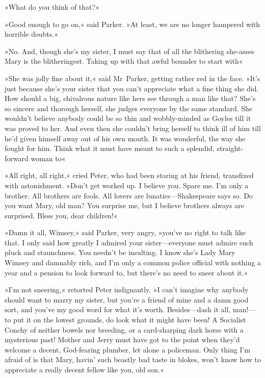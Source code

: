 »What do you think of that?«

»Good enough to go on,« said Parker. »At least, we are no longer hampered with horrible doubts.«

»No. And, though she's my sister, I must say that of all the blithering she-asses Mary is the blitheringest. Taking up with that awful bounder to start with\longdash«

»She was jolly fine about it,« said Mr~Parker, getting rather red in the face. »It's just because she's your sister that you can't appreciate what a fine thing she did. How should a big, chivalrous nature like hers see through a man like that? She's so sincere and thorough herself, she judges everyone by the same standard. She wouldn't believe anybody could be so thin and wobbly-minded as Goyles till it was proved to her. And even then she couldn't bring herself to think ill of him till he'd given himself away out of his own mouth. It was wonderful, the way she fought for him. Think what it must have meant to such a splendid, straight-forward woman to\longdash«

»All right, all right,« cried Peter, who had been staring at his friend, transfixed with astonishment. »Don't get worked up. I believe you. Spare me. I'm only a brother. All brothers are fools. All lovers are lunatics—Shakespeare says so. Do you want Mary, old man? You surprise me, but I believe brothers always are surprised. Bless you, dear children!«

»Damn it all, Wimsey,« said Parker, very angry, »you've no right to talk like that. I only said how greatly I admired your sister—everyone must admire such pluck and staunchness. You needn't be insulting. I know she's Lady Mary Wimsey and damnably rich, and I'm only a common police official with nothing a year and a pension to look forward to, but there's no need to sneer about it.«

»I'm not sneering,« retorted Peter indignantly. »I can't imagine why anybody should want to marry my sister, but you're a friend of mine and a damn good sort, and you've my good word for what it's worth. Besides—dash it all, man!—to put it on the lowest grounds, do look what it might have been! A Socialist Conchy of neither bowels nor breeding, or a card-sharping dark horse with a mysterious past! Mother and Jerry must have got to the point when they'd welcome a decent, God-fearing plumber, let alone a policeman. Only thing I'm afraid of is that Mary, havin' such beastly bad taste in blokes, won't know how to appreciate a really decent fellow like you, old son.«

